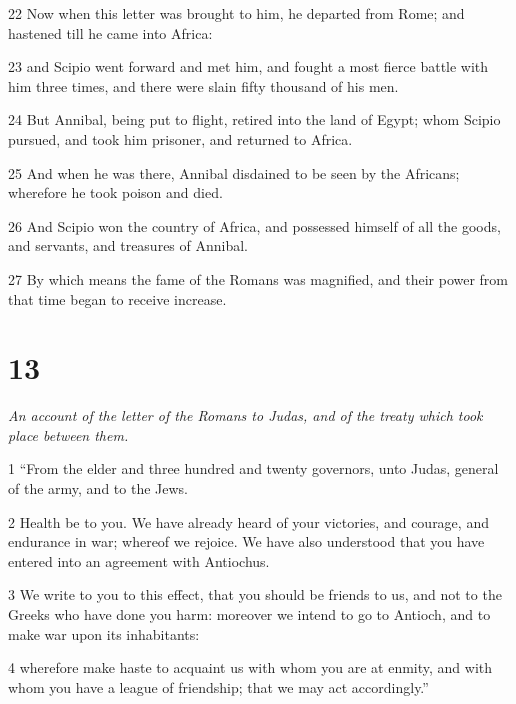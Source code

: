 \par 22 Now when this letter was brought to him, he departed from Rome; and hastened till he came into Africa: 

\par 23 and Scipio went forward and met him, and fought a most fierce battle with him three times, and there were slain fifty thousand of his men. 

\par 24 But Annibal, being put to flight, retired into the land of Egypt; whom Scipio pursued, and took him prisoner, and returned to Africa. 

\par 25 And when he was there, Annibal disdained to be seen by the Africans; wherefore he took poison and died. 

\par 26 And Scipio won the country of Africa, and possessed himself of all the goods, and servants, and treasures of Annibal. 

\par 27 By which means the fame of the Romans was magnified, and their power from that time began to receive increase. 

\chapter{13}

\par \textit{An account of the letter of the Romans to Judas, and of the treaty which took place between them.}

\par 1 “From the elder and three hundred and twenty governors, unto Judas, general of the army, and to the Jews. 

\par 2 Health be to you. We have already heard of your victories, and courage, and endurance in war; whereof we rejoice. We have also understood that you have entered into an agreement with Antiochus. 

\par 3 We write to you to this effect, that you should be friends to us, and not to the Greeks who have done you harm: moreover we intend to go to Antioch, and to make war upon its inhabitants: 

\par 4 wherefore make haste to acquaint us with whom you are at enmity, and with whom you have a league of friendship; that we may act accordingly.” 

